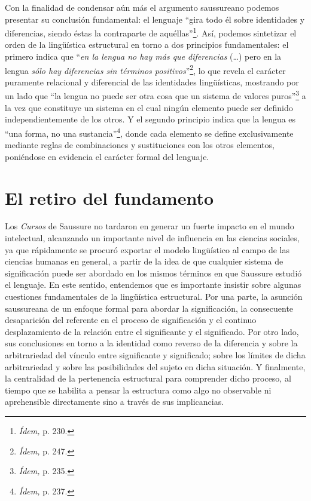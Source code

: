 Con la finalidad de condensar aún más el argumento saussureano podemos presentar su conclusión fundamental: el lenguaje \enquote{gira todo él sobre identidades y diferencias, siendo éstas la contraparte de aquéllas}\footnote{\emph{Ídem,} p. 230.}. Así, podemos sintetizar el orden de la lingüística estructural en torno a dos principios fundamentales: el primero indica que \enquote{\emph{en la lengua no hay más que diferencias} (\dots) pero en la lengua \emph{sólo hay diferencias sin términos positivos}}\footnote{\emph{Ídem,} p. 247.}, lo que revela el carácter puramente relacional y diferencial de las identidades lingüísticas, mostrando por un lado que \enquote{la lengua no puede ser otra cosa que un sistema de valores puros}\footnote{\emph{Ídem,} p. 235.} a la vez que constituye un sistema en el cual ningún elemento puede ser definido independientemente de los otros. Y el segundo principio indica que la lengua es \enquote{una forma, no una sustancia}\footnote{\emph{Ídem,} p. 237.}, donde cada elemento se define exclusivamente mediante reglas de combinaciones y sustituciones con los otros elementos, poniéndose en evidencia el carácter formal del lenguaje.

\section{El retiro del fundamento}

Los \emph{Cursos} de Saussure no tardaron en generar un fuerte impacto en el mundo intelectual, alcanzando un importante nivel de influencia en las ciencias sociales, ya que rápidamente se procuró exportar el modelo lingüístico al campo de las ciencias humanas en general, a partir de la idea de que cualquier sistema de significación puede ser abordado en los mismos términos en que Saussure estudió el lenguaje. En este sentido, entendemos que es importante insistir sobre algunas cuestiones fundamentales de la lingüística estructural. Por una parte, la asunción saussureana de un enfoque formal para abordar la significación, la consecuente desaparición del referente en el proceso de significación y el continuo desplazamiento de la relación entre el significante y el significado. Por otro lado, sus conclusiones en torno a la identidad como reverso de la diferencia y sobre la arbitrariedad del vínculo entre significante y significado; sobre los límites de dicha arbitrariedad y sobre las posibilidades del sujeto en dicha situación. Y finalmente, la centralidad de la pertenencia estructural para comprender dicho proceso, al tiempo que se habilita a pensar la estructura como algo no observable ni aprehensible directamente sino a través de sus implicancias.

